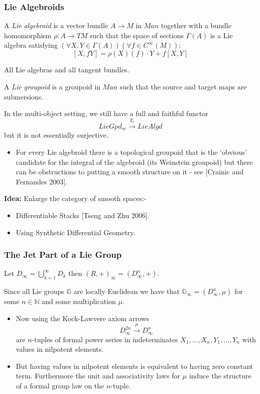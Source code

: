 \documentclass[]{beamer}
\begin{document}
\begin{frame}[fragile]\frametitle{Lie Algebroids}
\begin{definition}
A \emph{Lie algebroid} is a vector bundle $A\rightarrow M$ in $Man$ together with a bundle homomorphism $\rho:A\rightarrow TM$ such that the space of sections $\Gamma(A)$ is a Lie algebra satisfying $(\forall X,Y\in \Gamma(A))(\forall f\in C^{\infty}(M))$:
$$[X,fY]=\rho(X)(f)\cdot Y+f[X,Y]$$
\end{definition}
\begin{example}
    All Lie algebras and all tangent bundles.
\end{example}
\end{frame}

\begin{frame}[fragile]
\begin{definition}
A \emph{Lie groupoid} is a groupoid in $Man$ such that the source and target maps are submersions. 
\end{definition}

In the multi-object setting, we still have a full and faithful functor
$$LieGpd_{sc}\xrightarrow{T_{e}} LieAlgd$$
but it is not essentially surjective.
\begin{itemize}
	\item For every Lie algebroid there is a topological groupoid that is the `obvious' candidate for the integral of the algebroid (its Weinstein groupoid)  but there can be obstructions to putting a smooth structure on it - see [Crainic and Fernandes 2003].
\end{itemize}
\textbf{Idea: }Enlarge the category of smooth spaces:-
\begin{itemize}
	\item Differentiable Stacks [Tseng and Zhu 2006].
	\item Using Synthetic Differential Geometry.
\end{itemize}
\end{frame}
\begin{frame}\frametitle{The Jet Part of a Lie Group}
  \begin{example}
    Let $D_{\infty}=\bigcup_{k=1}^{\infty}D_{k}$ then $(R,+)_{\infty}=(D^n _{\infty},+)$.
  \end{example}
  \begin{example}
    Since all Lie groups $\mathbb{G}$ are locally Euclidean we have that $\mathbb{G}_{\infty}=(D^n _{\infty},\mu)$ for some $n\in\mathbb{N}$ and some multiplication $\mu$.
  \end{example}
  \begin{itemize}
    \item Now using the Kock-Lawvere axiom arrows
    $$D_{\infty}^{2n} \xrightarrow{\mu} D_{\infty}^n$$
    are $n$-tuples of formal power series in indeterminates $X_1,...,X_n,Y_1,...,Y_n$ with values in nilpotent elements.
    \item But having values in nilpotent elements is equivalent to having zero constant term.
    Furthermore the unit and associativity laws for $\mu$ induce the structure of a formal group law on the $n$-tuple.
  \end{itemize}
\end{frame}
\end{document}
